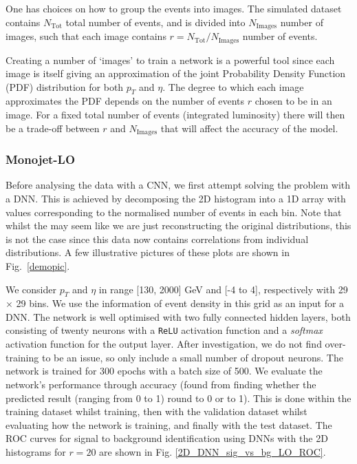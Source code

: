\documentclass[prd,aps,letterpaper,floatfix,superscriptaddress,preprintnumbers,twocolumn,10pt,nofootinbib]{revtex4-1}
\begin{document}
One has choices on how to group the events into images. The simulated dataset  contains $N_\text{Tot}$ total number of events, and is divided into $N_\text{Images}$ number of images, such that each image contains $r=N_\text{Tot}/N_\text{Images}$ number of events. 

 Creating a number of `images' to train a network  is a powerful tool since each image is itself giving an approximation of the joint Probability Density Function (PDF) distribution for both $p_T$ and $\eta$. The degree to which each image approximates the PDF depends on the number of events $r$ chosen to be in an image. For a fixed total number of events (integrated luminosity) there will then be a trade-off between $r$ and $N_\text{Images}$ that will affect the accuracy of the model.


\subsubsection{Monojet-LO}
Before analysing the data with a CNN, we first attempt solving the problem with a DNN. This is achieved by decomposing the 2D histogram into a 1D array with values corresponding to the normalised number of events in each bin. Note that whilst the may seem like we are just reconstructing the original distributions, this is not the case since this data now contains correlations from individual distributions. A few illustrative pictures of these plots are shown in Fig.~\ref{demopic}.

We consider $p_T$ and $\eta$ in range [130, 2000] GeV and [-4 to 4], respectively with 29 $\times$ 29 bins. We use the information of event density in this grid as an input for a DNN. The network is well optimised with two fully connected hidden layers, both consisting of twenty neurons with a {\tt ReLU} activation function and a {\it softmax} activation function for the output layer. After investigation, we do not find over-training to be an issue, so only include a small number of dropout neurons. The network is trained for 300 epochs with a batch size of 500. We evaluate the network's performance through accuracy (found from finding whether the predicted result (ranging from 0 to 1) round to 0 or to 1). This is done within the training dataset whilst training, then with the validation dataset whilst evaluating how the network is training, and finally with the test dataset. The ROC curves for signal to background identification using DNNs with the 2D histograms for $r=20$ are shown in Fig. \ref{2D_DNN_sig_vs_bg_LO_ROC}. 
\end{document}
